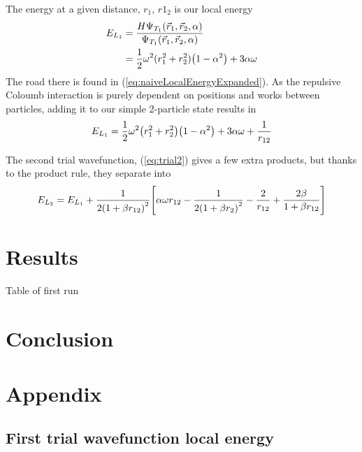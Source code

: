 \documentclass[10pt]{revtex4-1}
\begin{document}
The energy at a given distance, $r_1$, $r1_2$ is our local energy
\begin{align}
    E_{L_1} &= \frac{H \Psi_{T_1} \qty(\vec{r}_1, \vec{r}_2, \alpha )}{\Psi_{T_1} \qty(\vec{r}_1, \vec{r}_2, \alpha )}\nonumber \\
        &= \frac{1}{2}\omega^2 (r_1^2 + r_2^2)\qty(1 -\alpha^2 ) + 3\alpha \omega \label{eq:naiveLocalEnergy}
\end{align}
The road there is found in (\ref{eq:naiveLocalEnergyExpanded}). As the repulsive Coloumb interaction is purely dependent on positions
and works between particles, adding it to our simple 2-particle state results in
\begin{align}
    E_{L_1} = \frac{1}{2} \omega^2 \qty(r_1^2 + r_2^2) \qty( 1 -\alpha^2 ) + 3\alpha \omega + \frac{1}{ r_{12} } \label{eq:firstLocalEnergy}
\end{align}

The second trial wavefunction, (\ref{eq:trial2}) gives a few extra products, but thanks to the product rule, they separate into
\[
    E_{L_2} = E_{L_1} + \frac{1}{ 2 \qty( 1 + \beta r_{12} )^{2} }
    \qty[ \alpha \omega r_{12} - \frac{ 1 }{ 2 \qty( 1 + \beta r_{2} )^{2} } - \frac{ 2 }{ r_{12} } + \frac{ 2 \beta }{ 1 + \beta r_{12} } ]
\]


\section{Results}


\begin{table}[h!tb]
    \centering
    \caption{Table of first run}
\end{table}

\section{Conclusion}

\section{Appendix}

\subsection{First trial wavefunction local energy}
\end{document}
